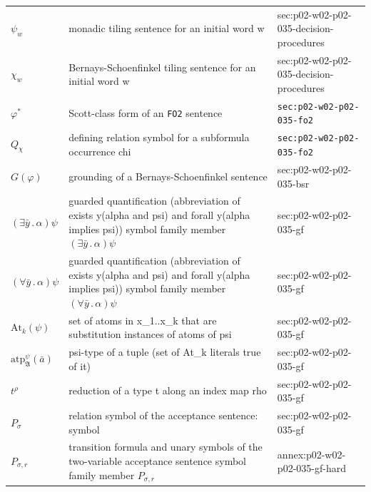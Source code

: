 \begin{longtable}{@{}p{}p{}p{}@{}}
\(\psi_w\) & monadic tiling sentence for an initial word w & sec:\allowbreak{}p02-\allowbreak{}w02-\allowbreak{}p02-\allowbreak{}035-\allowbreak{}decision-\allowbreak{}procedures \\
\(\chi_w\) & Bernays-Schoenfinkel tiling sentence for an initial word w & sec:\allowbreak{}p02-\allowbreak{}w02-\allowbreak{}p02-\allowbreak{}035-\allowbreak{}decision-\allowbreak{}procedures \\
\(\varphi^{*}\) & Scott-class form of an \texttt{FO2} sentence & \texttt{sec:\allowbreak{}p02-\allowbreak{}w02-\allowbreak{}p02-\allowbreak{}035-\allowbreak{}fo2} \\
\(Q_\chi\) & defining relation symbol for a subformula occurrence chi & \texttt{sec:\allowbreak{}p02-\allowbreak{}w02-\allowbreak{}p02-\allowbreak{}035-\allowbreak{}fo2} \\
\(G(\varphi)\) & grounding of a Bernays-Schoenfinkel sentence & sec:\allowbreak{}p02-\allowbreak{}w02-\allowbreak{}p02-\allowbreak{}035-\allowbreak{}bsr \\
\((\exists\bar y\,.\,\alpha)\psi\) & guarded quantification (abbreviation of exists y(alpha and psi) and forall y(alpha implies psi)) symbol family member \((\exists\bar y\,.\,\alpha)\psi\) & sec:\allowbreak{}p02-\allowbreak{}w02-\allowbreak{}p02-\allowbreak{}035-\allowbreak{}gf \\
\((\forall\bar y\,.\,\alpha)\psi\) & guarded quantification (abbreviation of exists y(alpha and psi) and forall y(alpha implies psi)) symbol family member \((\forall\bar y\,.\,\alpha)\psi\) & sec:\allowbreak{}p02-\allowbreak{}w02-\allowbreak{}p02-\allowbreak{}035-\allowbreak{}gf \\
\(\mathrm{At}_k(\psi)\) & set of atoms in x\_1..x\_k that are substitution instances of atoms of psi & sec:\allowbreak{}p02-\allowbreak{}w02-\allowbreak{}p02-\allowbreak{}035-\allowbreak{}gf \\
\(\mathrm{atp}^{\psi}_{\mathfrak A}(\bar a)\) & psi-type of a tuple (set of At\_k literals true of it) & sec:\allowbreak{}p02-\allowbreak{}w02-\allowbreak{}p02-\allowbreak{}035-\allowbreak{}gf \\
\(t^\rho\) & reduction of a type t along an index map rho & sec:\allowbreak{}p02-\allowbreak{}w02-\allowbreak{}p02-\allowbreak{}035-\allowbreak{}gf \\
\(P_\sigma\) & relation symbol of the acceptance sentence: symbol & sec:\allowbreak{}p02-\allowbreak{}w02-\allowbreak{}p02-\allowbreak{}035-\allowbreak{}gf \\
\(P_{\sigma,r}\) & transition formula and unary symbols of the two-variable acceptance sentence symbol family member \(P_{\sigma,r}\) & annex:\allowbreak{}p02-\allowbreak{}w02-\allowbreak{}p02-\allowbreak{}035-\allowbreak{}gf-\allowbreak{}hard \\

\end{longtable}
